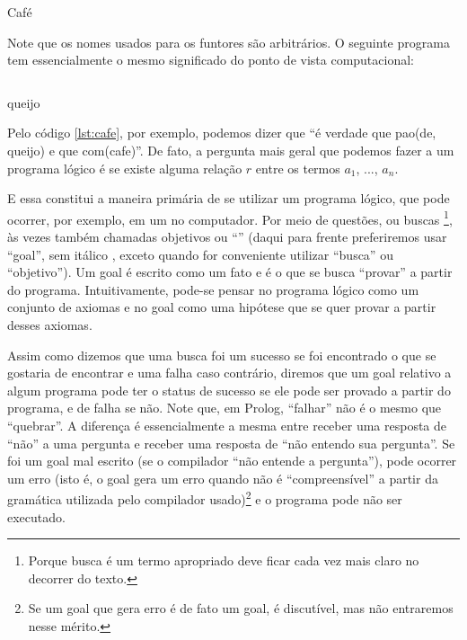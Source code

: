 \documentclass{article}
\begin{document}
    \begin{listing}
\inputminted{prolog}{../Exemplos/Cap0/prog1_cafe.pl}
    \caption{Café}\label{lst:cafe}
    \end{listing}

Note que os nomes usados para os funtores são arbitrários. O seguinte programa tem essencialmente o mesmo significado do ponto de vista computacional:\\

%
    \begin{listing}
\inputminted{prolog}{../Exemplos/Cap0/prog2_queijo.pl}
\caption{queijo}\label{lst:queijo}
    \end{listing}



Pelo código \ref{lst:cafe}, por exemplo, podemos dizer que ``é verdade que pao(de, queijo) e que com(cafe)''. De fato, a pergunta mais
geral que podemos fazer a um programa lógico é se existe alguma relação $r$ entre os termos $a_1$, ..., $a_n$.

E essa constitui a maneira primária de se utilizar um programa lógico, que pode ocorrer, por
exemplo, em um  no computador. Por meio de questões, ou buscas \footnote{Porque
  busca é um termo apropriado deve ficar cada vez mais claro no decorrer do texto.}, às vezes também
chamadas objetivos ou ``'' (daqui para frente preferiremos usar ``goal'', sem
itálico %
, exceto quando for conveniente utilizar ``busca'' ou ``objetivo''). Um goal é escrito como
um fato e é o que se busca ``provar'' a partir do programa. Intuitivamente, pode-se pensar no
programa lógico como um conjunto de axiomas e no goal como uma hipótese que se quer provar a partir desses axiomas.

Assim como dizemos que uma busca foi um sucesso se foi encontrado o que se gostaria de encontrar e uma falha caso contrário,
diremos que um goal relativo a algum programa pode ter o status de sucesso se ele pode ser provado a partir do programa, e de
falha se não. Note que, em Prolog, ``falhar'' não é o mesmo que ``quebrar''. A diferença é
essencialmente a mesma entre receber uma resposta de ``não'' a uma pergunta e receber uma resposta de
``não entendo sua pergunta''.  Se foi um goal mal escrito (se o compilador ``não entende a
pergunta''), pode ocorrer um erro (isto é, o goal gera um erro quando não é ``compreensível'' a
partir da gramática utilizada pelo compilador usado)\footnote{Se um goal que gera erro é de fato um
  goal, é discutível, mas não entraremos nesse mérito.} e o programa pode não ser executado.
\end{document}
